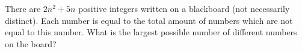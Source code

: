 \problem
There are $2 n^2 + 5 n$ positive integers written on a blackboard
(not necessarily distinct).
Each number is equal to the total amount of numbers which are not equal to this
number.
What is the largest possible number of different numbers on the board?

\solution

\endproblem
